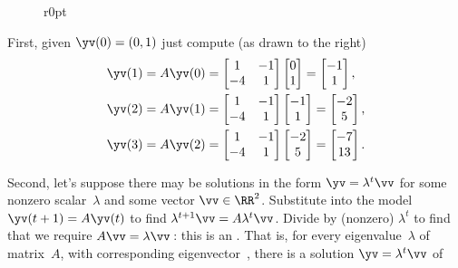 \begin{example}
\begin{solution} 
\begin{figure}[4]r{0pt}
\end{figure}
First, given \(\yv(0)=(0,1)\) just compute (as drawn to the right)
\begin{align*}
\yv(1)&=A\yv(0)=\begin{bmatrix} 1&-1\\-4&1 \end{bmatrix}
\begin{bmatrix} 0\\1 \end{bmatrix}
=\begin{bmatrix} -1\\1 \end{bmatrix},
\\\yv(2)&=A\yv(1)=\begin{bmatrix} 1&-1\\-4&1 \end{bmatrix}
\begin{bmatrix} -1\\1 \end{bmatrix}
=\begin{bmatrix} -2\\5 \end{bmatrix},
\\\yv(3)&=A\yv(2)=\begin{bmatrix} 1&-1\\-4&1 \end{bmatrix}
\begin{bmatrix} -2\\5 \end{bmatrix}
=\begin{bmatrix} -7\\13 \end{bmatrix}.
\end{align*}

Second, let's suppose there may be solutions in the form \(\yv=\lambda^t\vv\) for some nonzero scalar~\(\lambda\) and some vector \(\vv\in\RR^2\).
Substitute into the model \(\yv(t+1)=A\yv(t)\) to find \(\lambda^{t+1}\vv=A\lambda^t\vv\). 
Divide by (nonzero) \(\lambda^t\) to find that we require \(A\vv=\lambda\vv\)\,: this is an .
That is, for every eigenvalue~\(\lambda\) of matrix~\(A\), with corresponding eigenvector~\vv, there is a solution \(\yv=\lambda^t\vv\) of 


\end{solution}
\end{example}

